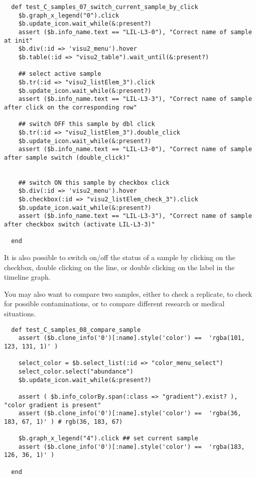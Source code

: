 \begin{verbatim}
  def test_C_samples_07_switch_current_sample_by_click
    $b.graph_x_legend("0").click
    $b.update_icon.wait_while(&:present?)
    assert ($b.info_name.text == "LIL-L3-0"), "Correct name of sample at init"
    $b.div(:id => 'visu2_menu').hover
    $b.table(:id => "visu2_table").wait_until(&:present?)

    ## select active sample
    $b.tr(:id => "visu2_listElem_3").click
    $b.update_icon.wait_while(&:present?)
    assert ($b.info_name.text == "LIL-L3-3"), "Correct name of sample after click on the corresponding row"

    ## switch OFF this sample by dbl click
    $b.tr(:id => "visu2_listElem_3").double_click
    $b.update_icon.wait_while(&:present?)
    assert ($b.info_name.text == "LIL-L3-0"), "Correct name of sample after sample switch (double_click)"
    

    ## switch ON this sample by checkbox click
    $b.div(:id => 'visu2_menu').hover
    $b.checkbox(:id => "visu2_listElem_check_3").click
    $b.update_icon.wait_while(&:present?)
    assert ($b.info_name.text == "LIL-L3-3"), "Correct name of sample after checkbox switch (activate LIL-L3-3)"
    
  end
\end{verbatim}
It is also possible to switch on/off the status of a sample by clicking on the checkbox, double clicking on the line, or double clicking on the label in the timeline graph.

\bigskip

You may also want to compare two samples, either to check a replicate, to check for possible contaminations, or to
compare different research or medical situations.

\begin{verbatim}
  def test_C_samples_08_compare_sample
    assert ($b.clone_info('0')[:name].style('color') ==  'rgba(101, 123, 131, 1)' )
    
    select_color = $b.select_list(:id => "color_menu_select")
    select_color.select("abundance")
    $b.update_icon.wait_while(&:present?)

    assert ( $b.info_colorBy.span(:class => "gradient").exist? ), "color gradient is present"
    assert ($b.clone_info('0')[:name].style('color') ==  'rgba(36, 183, 67, 1)' ) # rgb(36, 183, 67)

    $b.graph_x_legend("4").click ## set current sample
    assert ($b.clone_info('0')[:name].style('color') ==  'rgba(183, 126, 36, 1)' )

  end
\end{verbatim}

